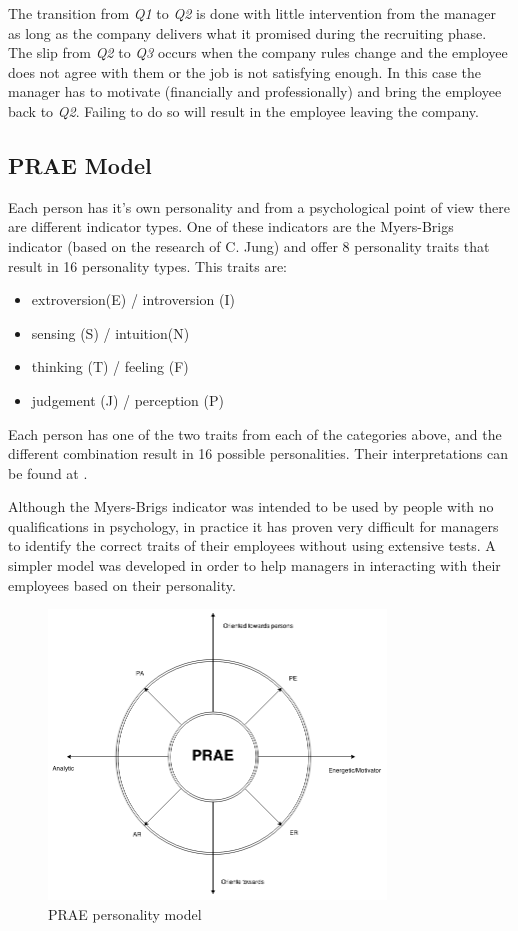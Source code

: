 The transition from \textit{Q1} to \textit{Q2} is done with little intervention from the manager as long as the company delivers what it promised during the recruiting phase. The slip from \textit{Q2} to \textit{Q3} occurs when the company rules change and the employee does not agree with them or the job is not satisfying enough. In this case the manager has to motivate (financially and professionally) and bring the employee back to \textit{Q2}. Failing to do so will result in the employee leaving the company.
\subsection{PRAE Model}
\label{sub-sec:prae}

Each person has it's own personality and from a psychological point of view there are different indicator types. One of these indicators are the Myers-Brigs indicator \cite{myers} (based on the research of C. Jung) and offer 8 personality traits that result in 16 personality types. This traits are:
\begin{itemize}
\item extroversion(E) / introversion (I)
\item sensing (S) / intuition(N)
\item thinking (T) / feeling (F) 
\item judgement (J) / perception (P)
\end{itemize}
Each person has one of the two traits from each of the categories above, and the different combination result in 16 possible personalities. Their interpretations can be found at \cite{mbf}.

Although the Myers-Brigs indicator was intended to be used by people with no qualifications in psychology, in practice it has proven very difficult for managers to identify the correct traits of their employees without using extensive tests. A simpler model was developed in order to help managers in interacting with their employees based on their personality. 

\begin{figure}[h]
\centering
\includegraphics[width=0.8\textwidth]{img/prae.png}
\caption{PRAE personality model}
\label{fig:prae}
\end{figure}

